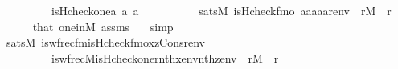 \begin{isabellebody}
\ \ \ \ \ \ \ \ \ is{\isacharunderscore}{\kern0pt}Hcheck{\isacharparenleft}{\kern0pt}one{\isacharcomma}{\kern0pt}a{}{\isacharcomma}{\kern0pt}\ a{}{\isacharcomma}{\kern0pt}\ a{}{\isacharparenright}{\kern0pt}\ {\isasymlongleftrightarrow}\isanewline
\ \ \ \ \ \ \ \ \ sats{\isacharparenleft}{\kern0pt}M{\isacharcomma}{\kern0pt}\ is{\isacharunderscore}{\kern0pt}Hcheck{\isacharunderscore}{\kern0pt}fm{\isacharparenleft}{\kern0pt}{}{\isacharhash}{\kern0pt}{\isacharplus}{\kern0pt}o{\isacharcomma}{\kern0pt}{}{\isacharcomma}{\kern0pt}{}{\isacharcomma}{\kern0pt}{}{\isacharparenright}{\kern0pt}{\isacharcomma}{\kern0pt}\ {\isacharbrackleft}{\kern0pt}a{}{\isacharcomma}{\kern0pt}a{}{\isacharcomma}{\kern0pt}a{}{\isacharcomma}{\kern0pt}a{}{\isacharcomma}{\kern0pt}a{}{\isacharcomma}{\kern0pt}r{\isacharbrackright}{\kern0pt}{\isacharat}{\kern0pt}env{\isacharparenright}{\kern0pt}{\isachardoublequoteclose}\ \ {\isachardoublequoteopen}r{\isasymin}M{\isachardoublequoteclose}\ \ r\isanewline
\ \ \ \ \isamarkupfalse%
\ that\ one{\isacharunderscore}{\kern0pt}in{\isacharunderscore}{\kern0pt}M\ assms\ \ \isamarkupfalse%
\ simp\isanewline
\ \ \isamarkupfalse%
\isanewline
\ \ \isamarkupfalse%
\ {\isachardoublequoteopen}sats{\isacharparenleft}{\kern0pt}M{\isacharcomma}{\kern0pt}\ is{\isacharunderscore}{\kern0pt}wfrec{\isacharunderscore}{\kern0pt}fm{\isacharparenleft}{\kern0pt}is{\isacharunderscore}{\kern0pt}Hcheck{\isacharunderscore}{\kern0pt}fm{\isacharparenleft}{\kern0pt}{}{\isacharhash}{\kern0pt}{\isacharplus}{\kern0pt}o{\isacharcomma}{\kern0pt}{}{\isacharcomma}{\kern0pt}{}{\isacharcomma}{\kern0pt}{}{\isacharparenright}{\kern0pt}{\isacharcomma}{\kern0pt}{}{\isacharcomma}{\kern0pt}{}{\isacharhash}{\kern0pt}{\isacharplus}{\kern0pt}x{\isacharcomma}{\kern0pt}{}{\isacharhash}{\kern0pt}{\isacharplus}{\kern0pt}z{\isacharparenright}{\kern0pt}{\isacharcomma}{\kern0pt}Cons{\isacharparenleft}{\kern0pt}r{\isacharcomma}{\kern0pt}env{\isacharparenright}{\kern0pt}{\isacharparenright}{\kern0pt}\isanewline
\ \ \ \ \ \ \ \ {\isasymlongleftrightarrow}\ is{\isacharunderscore}{\kern0pt}wfrec{\isacharparenleft}{\kern0pt}{\isacharhash}{\kern0pt}{\isacharhash}{\kern0pt}M{\isacharcomma}{\kern0pt}is{\isacharunderscore}{\kern0pt}Hcheck{\isacharparenleft}{\kern0pt}one{\isacharparenright}{\kern0pt}{\isacharcomma}{\kern0pt}r{\isacharcomma}{\kern0pt}nth{\isacharparenleft}{\kern0pt}x{\isacharcomma}{\kern0pt}env{\isacharparenright}{\kern0pt}{\isacharcomma}{\kern0pt}nth{\isacharparenleft}{\kern0pt}z{\isacharcomma}{\kern0pt}env{\isacharparenright}{\kern0pt}{\isacharparenright}{\kern0pt}{\isachardoublequoteclose}\ \ {\isachardoublequoteopen}r{\isasymin}M{\isachardoublequoteclose}\ \ r\isanewline

\end{isabellebody}
